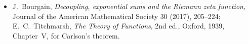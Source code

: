 \begin{itemize}
\item J.~Bourgain, \emph{Decoupling, exponential sums and the Riemann zeta function}, Journal of the American Mathematical Society 30 (2017), 205--224; E.~C.~Titchmarsh, \emph{The Theory of Functions}, 2nd ed., Oxford, 1939, Chapter~V, for Carlson's theorem.
\end{itemize}
